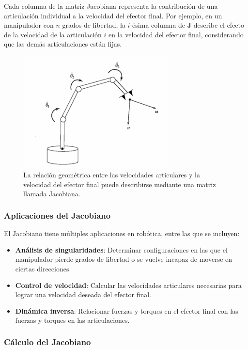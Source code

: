 Cada columna de la matriz Jacobiana representa la contribución de una articulación individual a la velocidad del efector final. Por ejemplo, en un manipulador con $n$ grados de libertad, la $i$-ésima columna de $\mathbf{J}$ describe el efecto de la velocidad de la articulación $i$ en la velocidad del efector final, considerando que las demás articulaciones están fijas.
	\begin{figure}[H]
	\centering
	\includegraphics[width=0.7\textwidth]{img/jacobiano.png}
	\caption{La relación geométrica entre las velocidades articulares y la velocidad del efector final puede describirse mediante una matriz llamada Jacobiana.}
	\label{fig:Jacobiano}
\end{figure}

\subsubsection{Aplicaciones del Jacobiano}

El Jacobiano tiene múltiples aplicaciones en robótica, entre las que se incluyen:
\begin{itemize}
	\item \textbf{Análisis de singularidades}: Determinar configuraciones en las que el manipulador pierde grados de libertad o se vuelve incapaz de moverse en ciertas direcciones.
	\item \textbf{Control de velocidad}: Calcular las velocidades articulares necesarias para lograr una velocidad deseada del efector final.
	\item \textbf{Dinámica inversa}: Relacionar fuerzas y torques en el efector final con las fuerzas y torques en las articulaciones.
\end{itemize}

\subsubsection{Cálculo del Jacobiano}

